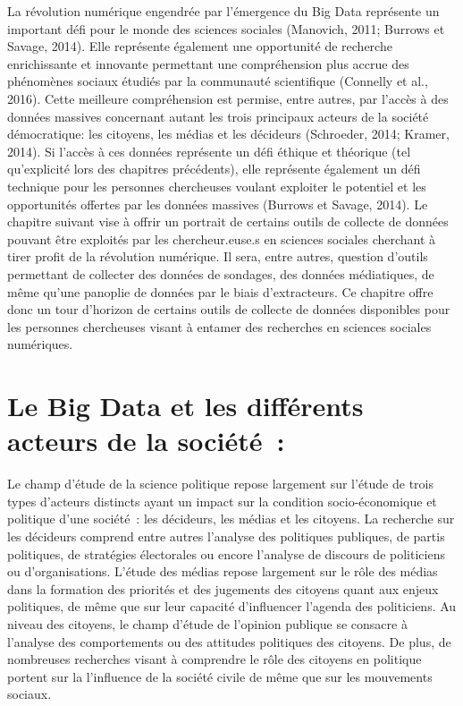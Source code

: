 \documentclass[
  letterpaper,
]{scrbook}
\begin{document}
La révolution numérique engendrée par l'émergence du Big Data représente
un important défi pour le monde des sciences sociales (Manovich, 2011;
Burrows et Savage, 2014). Elle représente également une opportunité de
recherche enrichissante et innovante permettant une compréhension plus
accrue des phénomènes sociaux étudiés par la communauté scientifique
(Connelly et al., 2016). Cette meilleure compréhension est permise,
entre autres, par l'accès à des données massives concernant autant les
trois principaux acteurs de la société démocratique: les citoyens, les
médias et les décideurs (Schroeder, 2014; Kramer, 2014). Si l'accès à
ces données représente un défi éthique et théorique (tel qu'explicité
lors des chapitres précédents), elle représente également un défi
technique pour les personnes chercheuses voulant exploiter le potentiel
et les opportunités offertes par les données massives (Burrows et
Savage, 2014). Le chapitre suivant vise à offrir un portrait de certains
outils de collecte de données pouvant être exploités par les
chercheur.euse.s en sciences sociales cherchant à tirer profit de la
révolution numérique. Il sera, entre autres, question d'outils
permettant de collecter des données de sondages, des données
médiatiques, de même qu'une panoplie de données par le biais
d'extracteurs. Ce chapitre offre donc un tour d'horizon de certains
outils de collecte de données disponibles pour les personnes chercheuses
visant à entamer des recherches en sciences sociales numériques.

\hypertarget{le-big-data-et-les-diffuxe9rents-acteurs-de-la-sociuxe9tuxe9}{%
\section{\texorpdfstring{\textbf{Le Big Data et les différents acteurs
de la
société~:}}{Le Big Data et les différents acteurs de la société~:}}\label{le-big-data-et-les-diffuxe9rents-acteurs-de-la-sociuxe9tuxe9}}

Le champ d'étude de la science politique repose largement sur l'étude de
trois types d'acteurs distincts ayant un impact sur la condition
socio-économique et politique d'une société~: les décideurs, les médias
et les citoyens. La recherche sur les décideurs comprend entre autres
l'analyse des politiques publiques, de partis politiques, de stratégies
électorales ou encore l'analyse de discours de politiciens ou
d'organisations. L'étude des médias repose largement sur le rôle des
médias dans la formation des priorités et des jugements des citoyens
quant aux enjeux politiques, de même que sur leur capacité d'influencer
l'agenda des politiciens. Au niveau des citoyens, le champ d'étude de
l'opinion publique se consacre à l'analyse des comportements ou des
attitudes politiques des citoyens. De plus, de nombreuses recherches
visant à comprendre le rôle des citoyens en politique portent sur la
l'influence de la société civile de même que sur les mouvements sociaux.
\end{document}
